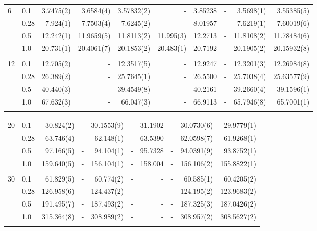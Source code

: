 \begin{landscape}
\begin{table} [H]
\begin{tabularx}{\hsize}{l:l|RRRRRRRR}
		6 & 0.1 & 3.7475(2) & 3.6584(4) & 3.57832(2) & - & 3.85238 & - & 3.5698(1) & 3.55385(5) \\ 
		& 0.28 & 7.924(1) & 7.7503(4) & 7.6245(2) & - & 8.01957 & - & 7.6219(1) & 7.60019(6) \\
		& 0.5 & 12.242(1) & 11.9659(5) & 11.8113(2) & 11.995(3) & 12.2713 & - & 11.8108(2) & 11.78484(6) \\
		& 1.0 & 20.731(1) & 20.4061(7) & 20.1853(2) & 20.483(1) & 20.7192 & - & 20.1905(2) & 20.15932(8) \\ \hdashline \\
		
		12 & 0.1 & 12.705(2) & - & 12.3517(5) & - & 12.9247 & - & 12.3201(3) & 12.26984(8) \\ 
		& 0.28 & 26.389(2) & - & 25.7645(1) & - & 26.5500 & - & 25.7038(4) & 25.63577(9) \\
		& 0.5 & 40.440(3) & - & 39.4549(8) & - & 40.2161 & - & 39.2660(4) & 39.1596(1) \\
		& 1.0 & 67.632(3) & - & 66.047(3) & - & 66.9113 & - & 65.7946(8) & 65.7001(1) \\ \hdashline
	\end{tabularx}
\end{table}

\begin{table} [H]
	\begin{tabularx}{\hsize}{l:l|RRRRRRRR} \\
		\label{tab:quantumdotswinteraction2D2}
		20 & 0.1 & 30.824(2) & - & 30.1553(9) & - & 31.1902 & - & 30.0730(6) & 29.9779(1) \\ 
		& 0.28 & 63.746(4) & - & 62.148(1) & - & 63.5390 & - & 62.0598(7) & 61.9268(1) \\
		& 0.5 & 97.166(5) & - & 94.104(1) & - & 95.7328 & - & 94.0391(9) & 93.8752(1) \\
		& 1.0 & 159.640(5) & - & 156.104(1) & - & 158.004 & - & 156.106(2) & 155.8822(1) \\ \hdashline \\
		
		30 & 0.1 & 61.829(5) & - & 60.774(2) & - & - & - & 60.585(1) & 60.4205(2) \\ 
		& 0.28 & 126.958(6) & - & 124.437(2) & - & - & - & 124.195(2) & 123.9683(2) \\
		& 0.5 & 191.495(7) & - & 187.493(2) & - & - & - & 187.325(3) & 187.0426(2) \\
		& 1.0 & 315.364(8) & - & 308.989(2) & - & - & - & 308.957(2) & 308.5627(2) \\ \hdashline \\
		

\end{tabularx}
\end{table}
\end{landscape}
